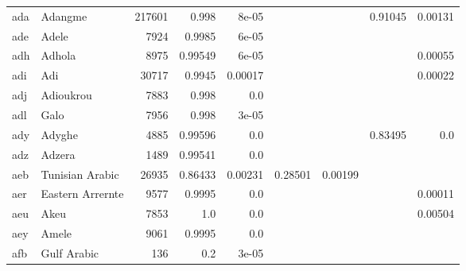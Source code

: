 \documentclass[11pt]{article}
\begin{document}
\begin{table*}[ht]
{\begin{tabular}{llrrrrrrr}
ada         & Adangme         & 217601         & 0.998         & 8e-05         &          &          & 0.91045         & 0.00131         \\

ade         & Adele         & 7924         & 0.9985         & 6e-05         &          &          &          &          \\

adh         & Adhola         & 8975         & 0.99549         & 6e-05         &          &          &          & 0.00055         \\

adi         & Adi         & 30717         & 0.9945         & 0.00017         &          &          &          & 0.00022         \\

adj         & Adioukrou         & 7883         & 0.998         & 0.0         &          &          &          &          \\

adl         & Galo         & 7956         & 0.998         & 3e-05         &          &          &          &          \\

ady         & Adyghe         & 4885         & 0.99596         & 0.0         &          &          & 0.83495         & 0.0         \\

adz         & Adzera         & 1489         & 0.99541         & 0.0         &          &          &          &          \\

aeb         & Tunisian Arabic         & 26935         & 0.86433         & 0.00231         & 0.28501         & 0.00199         &          &          \\

aer         & Eastern Arrernte         & 9577         & 0.9995         & 0.0         &          &          &          & 0.00011         \\

aeu         & Akeu         & 7853         & 1.0         & 0.0         &          &          &          & 0.00504         \\

aey         & Amele         & 9061         & 0.9995         & 0.0         &          &          &          &          \\

afb         & Gulf Arabic         & 136         & 0.2         & 3e-05         &          &          &          &          \\


\end{tabular}}
\end{table*}
\end{document}
